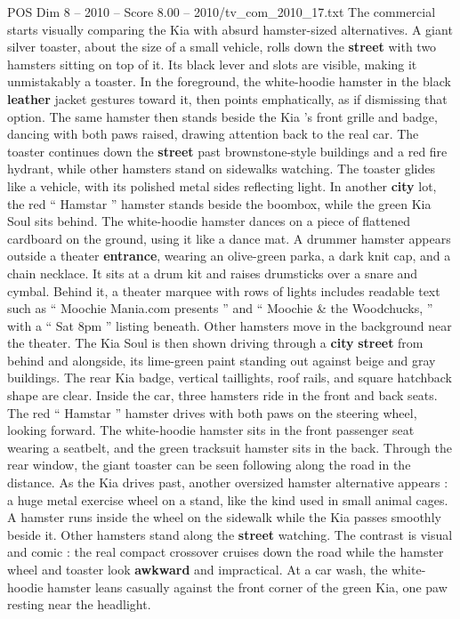\begin{textsample}{POS Dim 8 – 2010 – Score 8.00 – 2010/tv\_com\_2010\_17.txt}
The commercial starts visually comparing the Kia with absurd hamster-sized alternatives.
A giant silver toaster, about the size of a small vehicle, rolls down the \textbf{street} with two hamsters sitting on top of it.
Its black lever and slots are visible, making it unmistakably a toaster.
In the foreground, the white-hoodie hamster in the black \textbf{leather} jacket gestures toward it, then points emphatically, as if dismissing that option.
The same hamster then stands beside the Kia ’s front grille and badge, dancing with both paws raised, drawing attention back to the real car.
The toaster continues down the \textbf{street} past brownstone-style buildings and a red fire hydrant, while other hamsters stand on sidewalks watching.
The toaster glides like a vehicle, with its polished metal sides reflecting light.
In another \textbf{city} lot, the red “ Hamstar ” hamster stands beside the boombox, while the green Kia Soul sits behind.
The white-hoodie hamster dances on a piece of flattened cardboard on the ground, using it like a dance mat.
A drummer hamster appears outside a theater \textbf{entrance}, wearing an olive-green parka, a dark knit cap, and a chain necklace.
It sits at a drum kit and raises drumsticks over a snare and cymbal.
Behind it, a theater marquee with rows of lights includes readable text such as “ Moochie Mania.com presents ” and “ Moochie \& the Woodchucks, ” with a “ Sat 8pm ” listing beneath.
Other hamsters move in the background near the theater.
The Kia Soul is then shown driving through a \textbf{city} \textbf{street} from behind and alongside, its lime-green paint standing out against beige and gray buildings.
The rear Kia badge, vertical taillights, roof rails, and square hatchback shape are clear.
Inside the car, three hamsters ride in the front and back seats.
The red “ Hamstar ” hamster drives with both paws on the steering wheel, looking forward.
The white-hoodie hamster sits in the front passenger seat wearing a seatbelt, and the green tracksuit hamster sits in the back.
Through the rear window, the giant toaster can be seen following along the road in the distance.
As the Kia drives past, another oversized hamster alternative appears : a huge metal exercise wheel on a stand, like the kind used in small animal cages.
A hamster runs inside the wheel on the sidewalk while the Kia passes smoothly beside it.
Other hamsters stand along the \textbf{street} watching.
The contrast is visual and comic : the real compact crossover cruises down the road while the hamster wheel and toaster look \textbf{awkward} and impractical.
At a car wash, the white-hoodie hamster leans casually against the front corner of the green Kia, one paw resting near the headlight.

\end{textsample}
